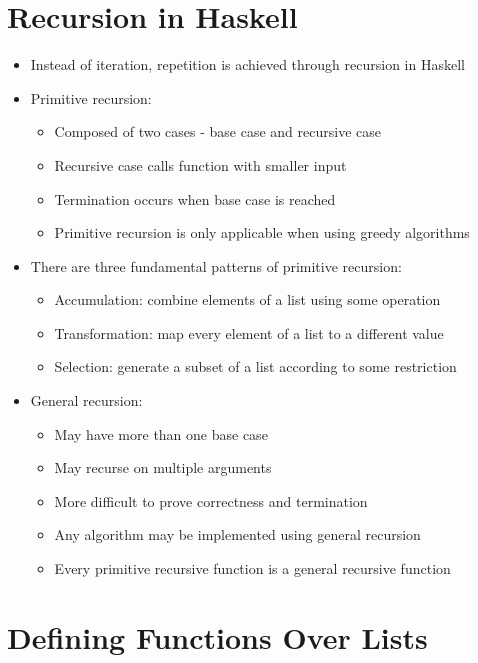 \documentclass{article}
\begin{document}
\section{Recursion in Haskell}

\begin{itemize}
\item Instead of iteration, repetition is achieved through recursion in Haskell
\item Primitive recursion:
\begin{itemize}
\item Composed of two cases - base case and recursive case
\item Recursive case calls function with smaller input
\item Termination occurs when base case is reached
\item Primitive recursion is only applicable when using greedy algorithms
\end{itemize}
\item There are three fundamental patterns of primitive recursion:
\begin{itemize}
\item Accumulation: combine elements of a list using some operation
\item Transformation: map every element of a list to a different value
\item Selection: generate a subset of a list according to some restriction
\end{itemize}
\item General recursion:
\begin{itemize}
\item May have more than one base case
\item May recurse on multiple arguments
\item More difficult to prove correctness and termination
\item Any algorithm may be implemented using general recursion
\item Every primitive recursive function is a general recursive function
\end{itemize}
\end{itemize}

\section{Defining Functions Over Lists}
\end{document}
